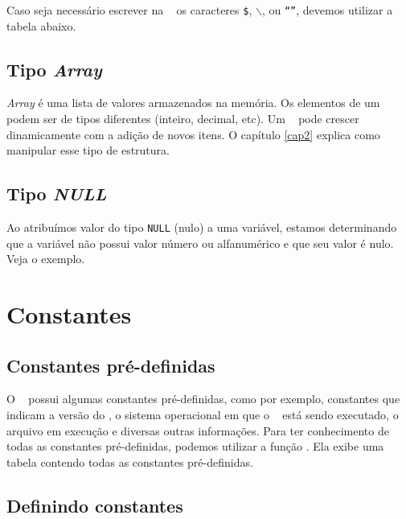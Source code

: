 

Caso seja necessário escrever na \tipostring~ os caracteres \texttt{\$}, 
\texttt{$\backslash$}, \texttt{\textquotesingle} ou \texttt{{``''}}, devemos utilizar a tabela abaixo. 

% 

\subsection{Tipo \textit{Array}}
\label{tipo-array}

\textit{Array} é uma lista de valores armazenados na memória. Os elementos de um \tipoarray~
podem ser de tipos diferentes (inteiro, decimal, \tipostring etc). Um \tipoarray~ pode crescer
dinamicamente com a adição de novos itens. O capítulo \ref{cap2} explica como
manipular esse tipo de estrutura.

\subsection{Tipo \textit{NULL}}
\label{tipo-null}

Ao atribuímos valor do tipo \texttt{NULL} (nulo) a uma variável, estamos determinando
que a variável não possui valor número ou alfanumérico e que seu valor é nulo. Veja o exemplo.



\section{Constantes}
\label{constantes}

\subsection{Constantes pré-definidas}
\label{constantes-pre-definidas}

O \php~ possui algumas constantes pré-definidas, como por exemplo, constantes que indicam a versão
do \php, o sistema operacional em que o \php~ está sendo executado, o arquivo em execução
e diversas outras informações. Para ter conhecimento de todas as constantes pré-definidas,
podemos utilizar a função \funcaophpinfo. Ela exibe uma tabela contendo todas as constantes
pré-definidas.

\subsection{Definindo constantes}
\label{definindo-constantes}

